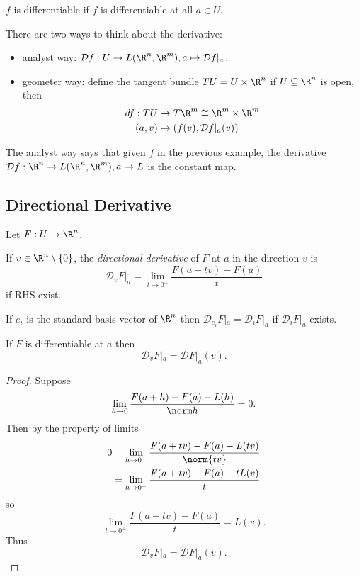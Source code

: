 \documentclass[a4paper]{article}
\newcommand*{\D}{\mathcal{D}}
\theoremstyle{definition}
\begin{document}
\begin{definition}[Differentiability]
  \(f\) is differentiable if \(f\) is differentiable at all \(a \in U\).
\end{definition}

There are two ways to think about the derivative:
\begin{itemize}
\item analyst way: \(\D f: U \to L(\R^n, \R^m), a \mapsto \D f|_a\). 
\item geometer way: define the tangent bundle \(TU = U \times \R^n\) if \(U \subseteq \R^n\) is open, then
  \begin{align*}
    df: TU &\to T\R^m \cong \R^m \times \R^m \\
    (a, v) &\mapsto (f(v), \D f|_a(v))
  \end{align*}
\end{itemize}

The analyst way says that given \(f\) in the previous example, the derivative \(\D f: \R^n \to L(\R^n, \R^m), a \mapsto L\) is the constant map.

\subsection{Directional Derivative}

Let \(F: U \to \R^n\).

\begin{definition}
  If \(v \in \R^n\setminus \{0\}\), the \emph{directional derivative} of \(F\) at \(a\) in the direction \(v\) is
  \[
    \D_v F|_a = \lim_{t \to 0^+} \frac{F(a + tv) - F(a)}{t}
  \]
  if RHS exist.
\end{definition}

\begin{eg}
  If \(e_i\) is the standard basis vector of \(\R^n\) then \(\D_{e_i} F|_a = \D_i F|_a\) if \(\D_i F|_a\) exists.
\end{eg}

\begin{proposition}
  If \(F\) is differentiable at \(a\) then
  \[
    \D_v F|_a = \D F|_a (v).
  \]
\end{proposition}

\begin{proof}
  Suppose
  \[
    \lim_{h \to 0} \frac{F(a + h) - F(a) - L(h)}{\norm h} = 0.
  \]
  Then by the property of limits
  \begin{align*}
    0 &= \lim_{h \to 0^+} \frac{F(a + tv) - F(a) - L(tv)}{\norm{tv}} \\
      &= \lim_{h \to 0^+} \frac{F(a + tv) - F(a) - t L(v)}{t}
  \end{align*}
  so
  \[
    \lim_{t \to 0^+} \frac{F(a + tv) - F(a)}{t} = L(v).
  \]
  Thus
  \[
    \D_v F|_a = \D F|_a(v).
  \]
\end{proof}
\end{document}
